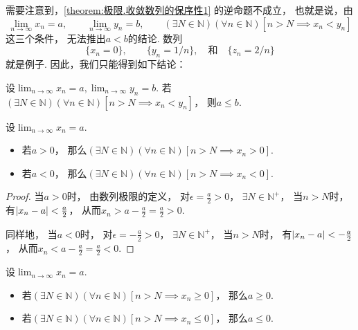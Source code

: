 需要注意到，\cref{theorem:极限.收敛数列的保序性1} 的逆命题不成立，
也就是说，由\[
	\lim_{n\to\infty} x_n = a, \qquad
	\lim_{n\to\infty} y_n = b, \qquad
	(\exists N\in\mathbb{N})
	(\forall n\in\mathbb{N})
	[n>N \implies x_n < y_n]
\]这三个条件，
无法推出\(a<b\)的结论.
数列\[
	\{x_n = 0\}, \qquad
	\{y_n = 1/n\},
	\quad\text{和}\quad
	\{z_n = 2/n\}
\]就是例子.
因此，我们只能得到如下结论：
\begin{theorem}\label{theorem:极限.收敛数列的保序性2}
设\(\lim_{n\to\infty} x_n = a,
\lim_{n\to\infty} y_n = b\).
若\((\exists N\in\mathbb{N})
(\forall n\in\mathbb{N})
[n>N \implies x_n < y_n]\)，
则\(a \leq b\).
\end{theorem}

\begin{corollary}[保号性]\label{theorem:极限.收敛数列的保号性1}
设\(\lim_{n\to\infty} x_n = a\).
\begin{itemize}
	\item 若\(a > 0\)，
	那么\((\exists N\in\mathbb{N})
	(\forall n\in\mathbb{N})
	[n>N \implies x_n > 0]\).

	\item 若\(a < 0\)，
	那么\((\exists N\in\mathbb{N})
	(\forall n\in\mathbb{N})
	[n>N \implies x_n < 0]\).
\end{itemize}
\begin{proof}
当\(a > 0\)时，
由数列极限的定义，
对\(\epsilon = \frac{a}{2} > 0\)，
\(\exists N \in \mathbb{N}^+\)，
当\(n > N\)时，
有\(\abs{x_n - a} < \frac{a}{2}\)，
从而\(x_n > a - \frac{a}{2} = \frac{a}{2} > 0\).

同样地，
当\(a < 0\)时，
对\(\epsilon = -\frac{a}{2} > 0\)，
\(\exists N \in \mathbb{N}^+\)，
当\(n > N\)时，
有\(\abs{x_n - a} < -\frac{a}{2}\)，
从而\(x_n < a - \frac{a}{2} = \frac{a}{2} < 0\).
\end{proof}
\end{corollary}

\begin{corollary}\label{theorem:极限.收敛数列的保号性2}
设\(\lim_{n\to\infty} x_n = a\).
\begin{itemize}
	\item 若\((\exists N\in\mathbb{N})
	(\forall n\in\mathbb{N})
	[n > N \implies x_n \geq 0]\)，
	那么\(a \geq 0\).

	\item 若\((\exists N\in\mathbb{N})
	(\forall n\in\mathbb{N})
	[n > N \implies x_n \leq 0]\)，
	那么\(a \leq 0\).
\end{itemize}
\end{corollary}

